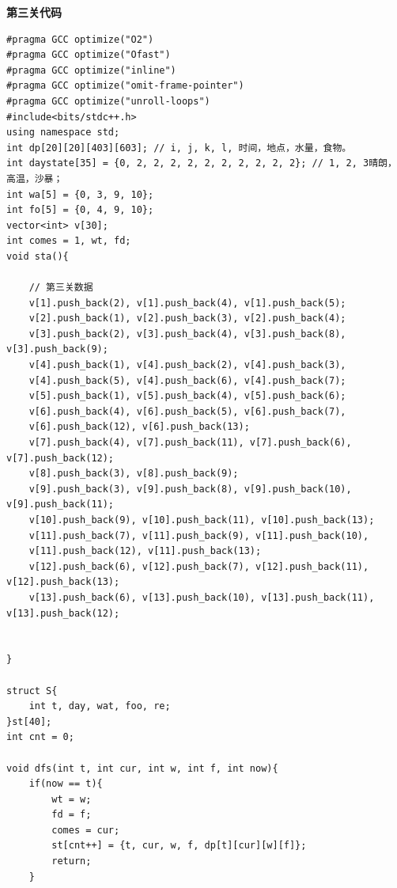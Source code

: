 \textbf{第三关代码}
\begin{verbatim}
#pragma GCC optimize("O2")
#pragma GCC optimize("Ofast")
#pragma GCC optimize("inline")
#pragma GCC optimize("omit-frame-pointer")
#pragma GCC optimize("unroll-loops")
#include<bits/stdc++.h>
using namespace std;
int dp[20][20][403][603]; // i, j, k, l, 时间，地点，水量，食物。
int daystate[35] = {0, 2, 2, 2, 2, 2, 2, 2, 2, 2, 2}; // 1, 2, 3晴朗，高温，沙暴；
int wa[5] = {0, 3, 9, 10};
int fo[5] = {0, 4, 9, 10};
vector<int> v[30];
int comes = 1, wt, fd;
void sta(){

    // 第三关数据
    v[1].push_back(2), v[1].push_back(4), v[1].push_back(5);
    v[2].push_back(1), v[2].push_back(3), v[2].push_back(4);
    v[3].push_back(2), v[3].push_back(4), v[3].push_back(8), v[3].push_back(9);
    v[4].push_back(1), v[4].push_back(2), v[4].push_back(3), 
    v[4].push_back(5), v[4].push_back(6), v[4].push_back(7);
    v[5].push_back(1), v[5].push_back(4), v[5].push_back(6);
    v[6].push_back(4), v[6].push_back(5), v[6].push_back(7),
    v[6].push_back(12), v[6].push_back(13);
    v[7].push_back(4), v[7].push_back(11), v[7].push_back(6), v[7].push_back(12);
    v[8].push_back(3), v[8].push_back(9);
    v[9].push_back(3), v[9].push_back(8), v[9].push_back(10), v[9].push_back(11);
    v[10].push_back(9), v[10].push_back(11), v[10].push_back(13);
    v[11].push_back(7), v[11].push_back(9), v[11].push_back(10),
    v[11].push_back(12), v[11].push_back(13);
    v[12].push_back(6), v[12].push_back(7), v[12].push_back(11), v[12].push_back(13);
    v[13].push_back(6), v[13].push_back(10), v[13].push_back(11), v[13].push_back(12);

    
}

struct S{
    int t, day, wat, foo, re;
}st[40];
int cnt = 0;

void dfs(int t, int cur, int w, int f, int now){
    if(now == t){
        wt = w;
        fd = f;
        comes = cur;
        st[cnt++] = {t, cur, w, f, dp[t][cur][w][f]};
        return;
    }


\end{verbatim}
